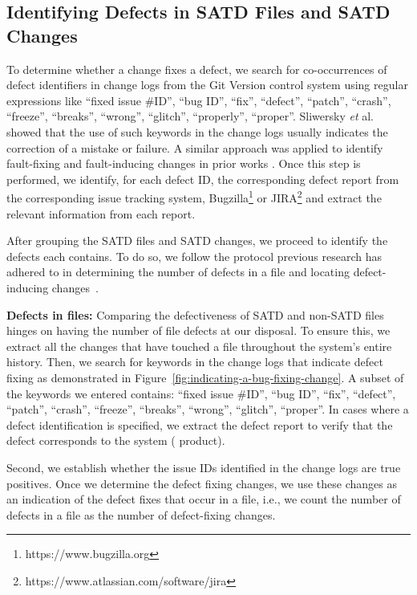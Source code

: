 \subsection{Identifying Defects in SATD Files and SATD Changes}
\label{bugs}
To determine whether a change fixes a defect, we search for co-occurrences of defect identifiers in change logs from the Git Version control system using regular expressions like ``fixed issue \#ID'', ``bug ID'',  ``fix'',  ``defect'',  ``patch'', ``crash'',  ``freeze'', ``breaks'', ``wrong'', ``glitch'', ``properly'', ``proper''.
Sliwersky \textit{et} al. \cite{sliwerski-msr-2005} showed that the use of such keywords in the change logs usually indicates the correction of a mistake or failure.
A similar  approach  was applied  to  identify  fault-fixing  and
fault-inducing  changes in  prior works  \cite{Kamei-tse-2013,Kim-tse-2008, sliwerski-msr-2005}. Once this step is performed, we identify, for each defect ID, the corresponding defect report from
the corresponding issue tracking system, \ie{} Bugzilla\footnote{https://www.bugzilla.org} or JIRA\footnote{https://www.atlassian.com/software/jira} and extract the relevant information from each report.

After grouping the SATD files and SATD changes, we proceed to identify the defects each contains. To do so, we follow the protocol previous research has adhered to in determining the number of defects in a file and locating defect-inducing changes~\cite{Kamei-tse-2013,Kim-tse-2008, sliwerski-msr-2005}.

\noindent\textbf{Defects in files:} Comparing the defectiveness of SATD and non-SATD files hinges on having the number of file defects at our disposal. To ensure this, we extract all the changes that have touched a file throughout the system's entire history. Then, we search for keywords in the change logs that indicate defect fixing as demonstrated in Figure~\ref{fig:indicating-a-bug-fixing-change}. A subset of the keywords we entered contains: ``fixed issue \#ID'', ``bug ID'',  ``fix'',  ``defect'',  ``patch'', ``crash'',  ``freeze'', ``breaks'', ``wrong'', ``glitch'', ``proper''. In cases where a defect identification is specified, we extract the defect report to verify that the defect corresponds to the system (\ie{} product).

Second, we establish whether the issue IDs identified in the change logs are true positives. Once we determine the defect fixing changes, we use these changes as an indication of the defect fixes that occur in a file, i.e., we count the number of defects in a file as the number of defect-fixing changes.


